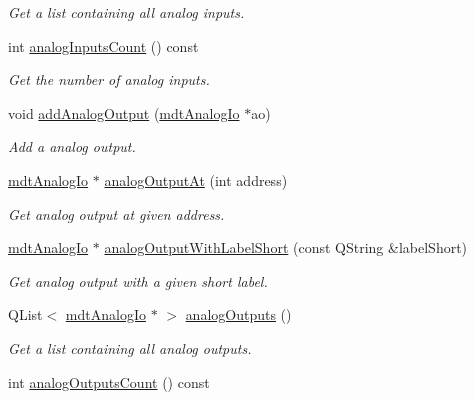 \begin{DoxyCompactItemize}
\begin{DoxyCompactList}\small\item\em Get a list containing all analog inputs. \end{DoxyCompactList}\item 
\hypertarget{classmdt_device_ios_a904069e2e641c92291226ea2524eadb3}{
int \hyperlink{classmdt_device_ios_a904069e2e641c92291226ea2524eadb3}{analogInputsCount} () const }
\label{classmdt_device_ios_a904069e2e641c92291226ea2524eadb3}

\begin{DoxyCompactList}\small\item\em Get the number of analog inputs. \end{DoxyCompactList}\item 
void \hyperlink{classmdt_device_ios_aeed1140ed869866a6edc738d3b2a6d0b}{addAnalogOutput} (\hyperlink{classmdt_analog_io}{mdtAnalogIo} $\ast$ao)
\begin{DoxyCompactList}\small\item\em Add a analog output. \end{DoxyCompactList}\item 
\hyperlink{classmdt_analog_io}{mdtAnalogIo} $\ast$ \hyperlink{classmdt_device_ios_a70eba4430604bc30841ddb72664a0e98}{analogOutputAt} (int address)
\begin{DoxyCompactList}\small\item\em Get analog output at given address. \end{DoxyCompactList}\item 
\hyperlink{classmdt_analog_io}{mdtAnalogIo} $\ast$ \hyperlink{classmdt_device_ios_aab2b2b1f8c887eb9f439cf495ec95fbd}{analogOutputWithLabelShort} (const QString \&labelShort)
\begin{DoxyCompactList}\small\item\em Get analog output with a given short label. \end{DoxyCompactList}\item 
\hypertarget{classmdt_device_ios_aa53fc12adeac76a039f005e72776362c}{
QList$<$ \hyperlink{classmdt_analog_io}{mdtAnalogIo} $\ast$ $>$ \hyperlink{classmdt_device_ios_aa53fc12adeac76a039f005e72776362c}{analogOutputs} ()}
\label{classmdt_device_ios_aa53fc12adeac76a039f005e72776362c}

\begin{DoxyCompactList}\small\item\em Get a list containing all analog outputs. \end{DoxyCompactList}\item 
\hypertarget{classmdt_device_ios_a8b9b14c4968e5aaae60ac7f91f77e06c}{
int \hyperlink{classmdt_device_ios_a8b9b14c4968e5aaae60ac7f91f77e06c}{analogOutputsCount} () const }
\label{classmdt_device_ios_a8b9b14c4968e5aaae60ac7f91f77e06c}


\end{DoxyCompactItemize}
